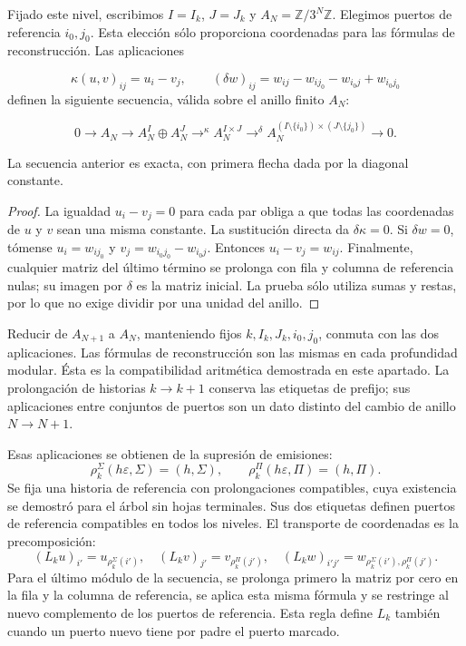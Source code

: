 Fijado este nivel, escribimos \(I=I_k\), \(J=J_k\) y \(A_N=\mathbb Z/3^N\mathbb Z\). Elegimos puertos de referencia \(i_0,j_0\). Esta elección sólo proporciona coordenadas para las fórmulas de reconstrucción. Las aplicaciones

\[
\kappa(u,v)_{ij}=u_i-v_j,
\qquad
(\delta w)_{ij}=w_{ij}-w_{ij_0}-w_{i_0j}+w_{i_0j_0}
\]
definen la siguiente secuencia, válida sobre el anillo finito \(A_N\):

\[
0\longrightarrow A_N\longrightarrow
A_N^I\oplus A_N^J\mathrel{\mathop{\longrightarrow}^{\kappa}}
A_N^{I\times J}\mathrel{\mathop{\longrightarrow}^{\delta}}
A_N^{(I\setminus\{i_0\})\times(J\setminus\{j_0\})}
\longrightarrow0.
\]
\begin{proposition}
\label{iv:cont:rectangular-exacta}
La secuencia anterior es exacta, con primera flecha dada por la diagonal constante.

\end{proposition}
\begin{proof}
La igualdad \(u_i-v_j=0\) para cada par obliga a que todas las coordenadas de \(u\) y \(v\) sean una misma constante. La sustitución directa da \(\delta\kappa=0\). Si \(\delta w=0\), tómense \(u_i=w_{ij_0}\) y \(v_j=w_{i_0j_0}-w_{i_0j}\). Entonces \(u_i-v_j=w_{ij}\). Finalmente, cualquier matriz del último término se prolonga con fila y columna de referencia nulas; su imagen por \(\delta\) es la matriz inicial. La prueba sólo utiliza sumas y restas, por lo que no exige dividir por una unidad del anillo.
\end{proof}

Reducir de \(A_{N+1}\) a \(A_N\), manteniendo fijos \(k,I_k,J_k,i_0,j_0\), conmuta con las dos aplicaciones. Las fórmulas de reconstrucción son las mismas en cada profundidad modular. Ésta es la compatibilidad aritmética demostrada en este apartado. La prolongación de historias \(k\to k+1\) conserva las etiquetas de prefijo; sus aplicaciones entre conjuntos de puertos son un dato distinto del cambio de anillo \(N\to N+1\).

Esas aplicaciones se obtienen de la supresión de emisiones:
\[
\rho_k^\Sigma(h\varepsilon,\Sigma)=(h,\Sigma),\qquad
\rho_k^\Pi(h\varepsilon,\Pi)=(h,\Pi).
\]
Se fija una historia de referencia con prolongaciones compatibles, cuya existencia se demostró para el árbol sin hojas terminales. Sus dos etiquetas definen puertos de referencia compatibles en todos los niveles. El transporte de coordenadas es la precomposición:
\[
(L_ku)_{i'}=u_{\rho_k^\Sigma(i')},\quad
(L_kv)_{j'}=v_{\rho_k^\Pi(j')},\quad
(L_kw)_{i'j'}=w_{\rho_k^\Sigma(i'),\rho_k^\Pi(j')}.
\]
Para el último módulo de la secuencia, se prolonga primero la matriz por cero en la fila y la columna de referencia, se aplica esta misma fórmula y se restringe al nuevo complemento de los puertos de referencia. Esta regla define \(L_k\) también cuando un puerto nuevo tiene por padre el puerto marcado.

